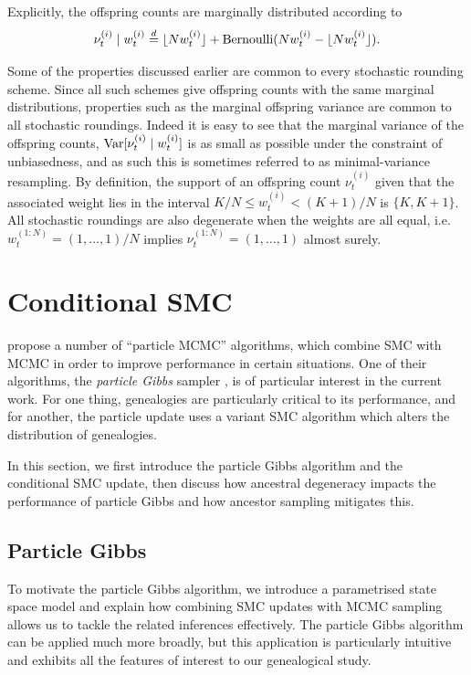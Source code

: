 Explicitly, the offspring counts are marginally distributed according to 
\begin{equation*}
\nu_t^{(i)} \mid w_t^{(i)}
\overset{d}{=} \lfloor N w_t^{(i)} \rfloor + \operatorname{Bernoulli}( Nw_t^{(i)} - \lfloor N w_t^{(i)} \rfloor ) .
\end{equation*}

Some of the properties discussed earlier are common to every stochastic rounding scheme. 
Since all such schemes give offspring counts with the same marginal distributions, properties such as the marginal offspring variance are common to all stochastic roundings. Indeed it is easy to see that the marginal variance of the offspring counts, $\operatorname{Var}[ \nu_t^{(i)} \mid w_t^{(i)} ]$ is as small as possible under the constraint of unbiasedness, and as such this is sometimes referred to as minimal-variance resampling.
By definition, the support of an offspring count $\nu_t^{(i)}$ given that the associated weight lies in the interval $K/N \leq w_t^{(i)} < (K+1)/N$ is $\{ K, K+1\}$. 
All stochastic roundings are also degenerate when the weights are all equal, i.e.\ $w_t^{(1:N)} = (1,\dots, 1)/N$ implies $\nu_t^{(1:N)}=(1,\dots,1)$ almost surely.





\section{Conditional SMC}
\label{sec:condSMC}
\textcite{andrieu2010} propose a number of ``particle MCMC'' algorithms, which combine SMC with MCMC in order to improve performance in certain situations.
One of their algorithms, the \emph{particle Gibbs} sampler \parencite[Section 2.4.3]{andrieu2010}, is of particular interest in the current work. For one thing, genealogies are particularly critical to its performance, and for another, the particle update uses a variant SMC algorithm which alters the distribution of genealogies.

In this section, we first introduce the particle Gibbs algorithm and the conditional SMC update, then discuss how ancestral degeneracy impacts the performance of particle Gibbs and how ancestor sampling mitigates this.




\subsection{Particle Gibbs}
\label{sec:particleGibbs}
To motivate the particle Gibbs algorithm, we introduce a parametrised state space model and explain how combining SMC updates with MCMC sampling allows us to tackle the related inferences effectively.
The particle Gibbs algorithm can be applied much more broadly, but this application is particularly intuitive and exhibits all the features of interest to our genealogical study.

